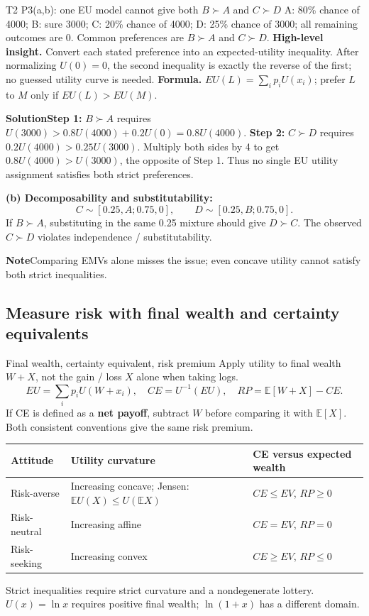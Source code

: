 \documentclass[10pt,a4paper]{article}
\newcommand{\ans}{\par\smallskip\textbf{\color{good}Solution\quad}}
\newcommand{\pit}{\par\smallskip\textbf{\color{warn}Note\quad}}
\newcommand{\E}{\mathbb E}
\begin{document}
\begin{question}{T2 P3(a,b): one EU model cannot give both $B\succ A$ and $C\succ D$}\label{q:t2p3}
A: 80\% chance of 4000; B: sure 3000; C: 20\% chance of 4000; D: 25\% chance of 3000; all remaining outcomes are 0. Common preferences are $B\succ A$ and $C\succ D$.
\textbf{High-level insight.} Convert each stated preference into an expected-utility inequality. After normalizing $U(0)=0$, the second inequality is exactly the reverse of the first; no guessed utility curve is needed.
\textbf{Formula.} $EU(L)=\sum_i p_iU(x_i)$; prefer $L$ to $M$ only if $EU(L)>EU(M)$.
\ans \textbf{Step 1:} $B\succ A$ requires $U(3000)>0.8U(4000)+0.2U(0)=0.8U(4000)$.
\textbf{Step 2:} $C\succ D$ requires $0.2U(4000)>0.25U(3000)$. Multiply both sides by 4 to get $0.8U(4000)>U(3000)$, the opposite of Step 1. Thus no single EU utility assignment satisfies both strict preferences.

\textbf{(b) Decomposability and substitutability:}
\[
C\sim[0.25,A;0.75,0],\qquad D\sim[0.25,B;0.75,0].
\]
If $B\succ A$, substituting in the same 0.25 mixture should give $D\succ C$. The observed $C\succ D$ violates independence / substitutability.
\pit Comparing EMVs alone misses the issue; even concave utility cannot satisfy both strict inequalities.
\end{question}

\subsection{Measure risk with final wealth and certainty equivalents}
\begin{card}{Final wealth, certainty equivalent, risk premium}
Apply utility to final wealth $W+X$, not the gain / loss $X$ alone when taking logs.
\[
EU=\sum_i p_iU(W+x_i),\quad CE=U^{-1}(EU),\quad RP=\E[W+X]-CE.
\]
If CE is defined as a \textbf{net payoff}, subtract $W$ before comparing it with $\E[X]$. Both consistent conventions give the same risk premium.
\small
\par\smallskip
\begin{tabularx}{\linewidth}{@{}P{2.5cm}Y Y@{}}
\toprule Attitude & Utility curvature & CE versus expected wealth \\\midrule
Risk-averse & Increasing concave; Jensen: $\E U(X)\le U(\E X)$ & $CE\le EV$, $RP\ge0$ \\
Risk-neutral & Increasing affine & $CE=EV$, $RP=0$ \\
Risk-seeking & Increasing convex & $CE\ge EV$, $RP\le0$ \\\bottomrule
\end{tabularx}\par\smallskip
\normalsize
Strict inequalities require strict curvature and a nondegenerate lottery. $U(x)=\ln x$ requires positive final wealth; $\ln(1+x)$ has a different domain.
\end{card}
\end{document}
